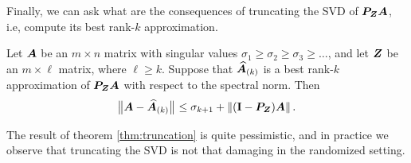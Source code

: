 Finally, we can ask what are the consequences of truncating the SVD
of $\bm{P}_{\bm{Z}}\bm{A}$, i.e, compute its best rank-$k$ approximation.
\begin{theorem} \label{thm:truncation}
Let $\bm{A}$ be an $m \times n$ matrix with singular values $\sigma_1 \geq \sigma_2 \geq \sigma_3 \geq \dots$,
and let $\bm{Z}$ be an $m \times \ell$ matrix, where $\ell \geq k$.
Suppose that $\widehat{\bm{A}}_{(k)}$ is a best rank-$k$ approximation of $\bm{P}_{\bm{Z}} \bm{A}$ with respect to the spectral norm.  Then
$$
{\bigl\Vert { \bm{A} - \widehat{\bm{A}}_{(k)} } \bigr\Vert}_{}
  \leq \sigma_{k+1} + \left\Vert {(\mathbf{I}- \bm{P}_{\bm{Z}}) \bm{A}} \right\Vert.
$$
\end{theorem}
\begin{remark} \rm
The result of theorem \ref{thm:truncation} is quite pessimistic, and
in practice we observe that truncating the SVD is not that damaging in
the randomized setting.
\end{remark}

